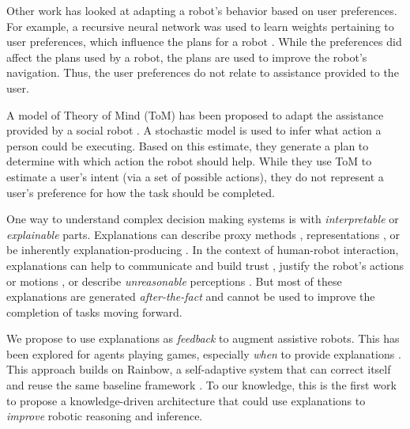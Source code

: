 \documentclass[letterpaper]{article} %
\begin{document}
Other work has looked at adapting a robot's behavior based on user preferences.
For example, a recursive neural network was used
to learn weights pertaining to user preferences, which influence the plans for
a robot \cite{Bacciu2014}.  While the preferences did affect the plans used by a robot,
the plans are used to improve the
robot's navigation.  Thus, the user preferences do not relate to assistance
provided to the user.

A model of Theory of Mind (ToM) has been proposed to adapt the assistance provided
by a social robot \cite{Gorur2017}.  A stochastic model is used to infer what action a person could
be executing.  Based on this estimate, they generate a plan to determine with which
action the robot should help.
While they use ToM to estimate a user's intent (via a set of possible actions),
they do not represent a user's preference for how the task should be completed.


One way to understand complex decision making systems is with
\emph{interpretable} or \emph{explainable} parts.  Explanations can describe
proxy methods \cite{why-trust,grad-cam,visualizing}, representations
\cite{netdissect2017,cavs}, or be inherently explanation-producing
\cite{multimodal}.
In the context
of human-robot interaction, explanations can help to communicate and
build trust \cite{wang2016trust}, justify the robot's actions
\cite{stange2020effects} or motions \cite{dragan2013legibility}, or
describe \emph{unreasonable} perceptions \cite{gilpin-hri}.  But most of
these explanations are generated \emph{after-the-fact} and cannot be used
to improve the completion of tasks moving forward.

We propose to use explanations as \emph{feedback} to augment assistive
robots.  This has been explored for agents playing games, especially
\emph{when} to provide explanations \cite{li2020reasoning}.  This approach
builds on Rainbow, a self-adaptive system that can correct itself and
reuse the same baseline framework \cite{rainbow}.  To our knowledge,
this is the first work to propose a knowledge-driven architecture that could use explanations to \emph{improve} robotic reasoning and inference.
\end{document}
